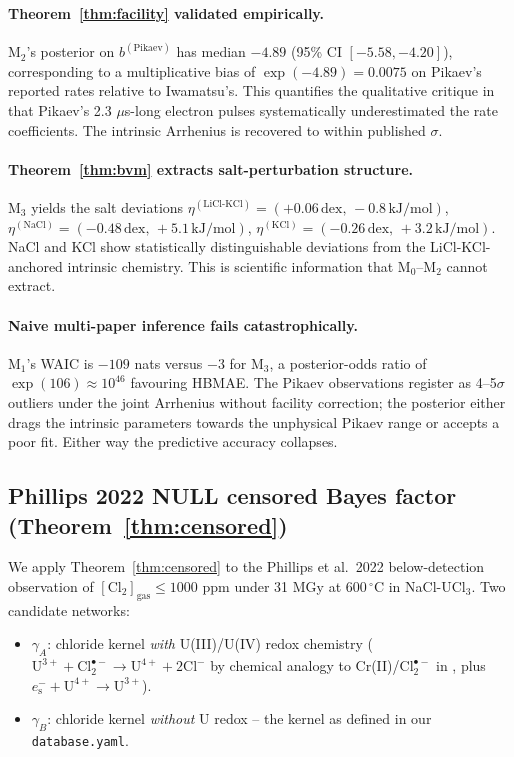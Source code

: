 \documentclass[11pt]{article}
\theoremstyle{definition}
\theoremstyle{remark}
\newcommand{\eS}{e_{\mathrm{s}}^{-}\xspace}
\newcommand{\Clt}{\mathrm{Cl}_2^{\bullet-}\xspace}
\begin{document}
\paragraph{Theorem~\ref{thm:facility} validated empirically.} M$_2$'s posterior on
$b^{(\mathrm{Pikaev})}$ has median $-4.89$ (95\% CI $[-5.58, -4.20]$), corresponding
to a multiplicative bias of $\exp(-4.89) = 0.0075$ on Pikaev's reported rates relative
to Iwamatsu's. This quantifies the qualitative critique in \citet{Iwamatsu2022} that
Pikaev's 2.3 $\mu$s-long electron pulses systematically underestimated the rate
coefficients. The intrinsic Arrhenius is recovered to within published $\sigma$.

\paragraph{Theorem~\ref{thm:bvm} extracts salt-perturbation structure.} M$_3$ yields
the salt deviations $\eta^{(\mathrm{LiCl\text{-}KCl})} = (+0.06\,\mathrm{dex},\,-0.8\,\mathrm{kJ/mol})$,
$\eta^{(\mathrm{NaCl})} = (-0.48\,\mathrm{dex},\,+5.1\,\mathrm{kJ/mol})$,
$\eta^{(\mathrm{KCl})} = (-0.26\,\mathrm{dex},\,+3.2\,\mathrm{kJ/mol})$.
NaCl and KCl show statistically distinguishable deviations from the LiCl-KCl-anchored
intrinsic chemistry. This is scientific information that M$_0$--M$_2$ cannot extract.

\paragraph{Naive multi-paper inference fails catastrophically.} M$_1$'s WAIC is
$-109$ nats versus $-3$ for M$_3$, a posterior-odds ratio of $\exp(106) \approx 10^{46}$
favouring HBMAE. The Pikaev observations register as 4--5$\sigma$ outliers under the joint
Arrhenius without facility correction; the posterior either drags the intrinsic
parameters towards the unphysical Pikaev range or accepts a poor fit. Either way the
predictive accuracy collapses.

\subsection{Phillips 2022 NULL censored Bayes factor (Theorem~\ref{thm:censored})}\label{sec:phillips_null}

We apply Theorem~\ref{thm:censored} to the Phillips et al.\ 2022 below-detection
observation of $[\mathrm{Cl}_2]_{\mathrm{gas}}\le 1000$ ppm under 31 MGy at 600\,$^\circ$C
in NaCl-UCl$_3$. Two candidate networks:
\begin{itemize}\setlength\itemsep{0pt}
\item $\gamma_A$: chloride kernel \emph{with} U(III)/U(IV) redox chemistry
       ($\mathrm{U}^{3+}+\Clt\to\mathrm{U}^{4+}+2\mathrm{Cl}^-$ by chemical analogy to
       Cr(II)/$\Clt$ in \citealt{Iwamatsu2026}, plus $\eS+\mathrm{U}^{4+}\to\mathrm{U}^{3+}$).
\item $\gamma_B$: chloride kernel \emph{without} U redox -- the kernel as defined in
       our \texttt{database.yaml}.
\end{itemize}
\end{document}
